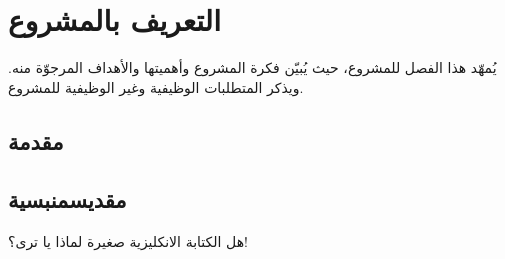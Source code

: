 

\chapter{التعريف بالمشروع}
يُمهّد هذا الفصل للمشروع، حيث يُبيّن فكرة المشروع وأهميتها والأهداف المرجوّة منه. ويذكر المتطلبات الوظيفية وغير الوظيفية للمشروع.

\section{مقدمة}
\begin{english}
\lipsum[100-100]
\lipsum[100-100]
\lipsum[100-100]
\lipsum[100-100]
\lipsum[100-100]
\lipsum[100-100]
\end{english}

\section{مقديسمنبسية}
هل الكتابة الانكليزية صغيرة  لماذا يا ترى؟!

\begin{english}
\lipsum[5-20]
\end{english}


